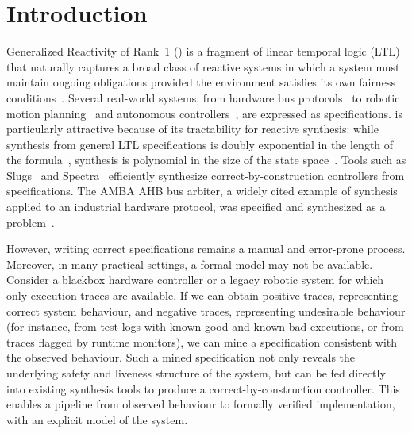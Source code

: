 \section{Introduction}\label{sec:intro}

Generalized Reactivity of Rank~1 (\GRone) is a fragment of linear
temporal logic (LTL) that naturally captures a broad class of
reactive systems in which a system must maintain ongoing obligations
provided the environment satisfies its own fairness
conditions~\cite{PitermanPS06}.
Several real-world systems, from hardware bus
protocols~\cite{BloemGJPPW07} to robotic motion
planning~\cite{KressGazitFP09} and autonomous
controllers~\cite{MaozR21}, are expressed as \GRone specifications.
\GRone is particularly attractive because of its tractability for
reactive synthesis: while synthesis from general LTL specifications
is doubly exponential in the length of the
formula~\cite{PnueliR89}, \GRone synthesis is polynomial in the
size of the state space~\cite{PitermanPS06}.
Tools such as Slugs~\cite{EhlersR16} and Spectra~\cite{MaozR21}
efficiently synthesize correct-by-construction controllers from
\GRone specifications.
The AMBA AHB bus arbiter, a widely cited example of synthesis
applied to an industrial hardware protocol, was specified and
synthesized as a \GRone problem~\cite{BloemGJPPW07}.

However, writing correct \GRone specifications remains a manual and
error-prone process.
Moreover, in many practical settings, a formal model may not be
available.
Consider a blackbox hardware controller or a legacy robotic system
for which only execution traces are available.
If we can obtain positive traces, representing correct system
behaviour, and negative traces, representing undesirable behaviour
(for instance, from test logs with known-good and known-bad
executions, or from traces flagged by runtime monitors), we can
mine a \GRone specification consistent with the observed behaviour.
Such a mined specification not only reveals the underlying safety
and liveness structure of the system, but can be fed directly into
existing \GRone synthesis tools to produce a correct-by-construction
controller.
This enables a pipeline from observed behaviour to formally verified
implementation, with an explicit model of the system.

